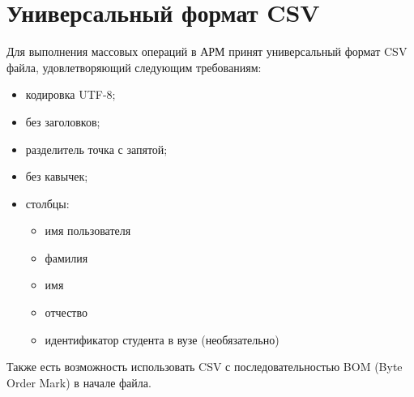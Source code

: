\section{Универсальный формат CSV} \label{sec:csv_format}
Для выполнения массовых операций в АРМ принят универсальный формат CSV файла, удовлетворяющий следующим требованиям:
\begin{itemize}
	\item кодировка UTF-8;
	\item без заголовков;
	\item разделитель точка с запятой;
	\item без кавычек;
	\item столбцы:
	\begin{itemize}
		\item имя пользователя
		\item фамилия
		\item имя
		\item отчество
		\item идентификатор студента в вузе (необязательно)
	\end{itemize}
\end{itemize}
Также есть возможность использовать CSV с последовательностью BOM (Byte Order Mark) в начале файла.